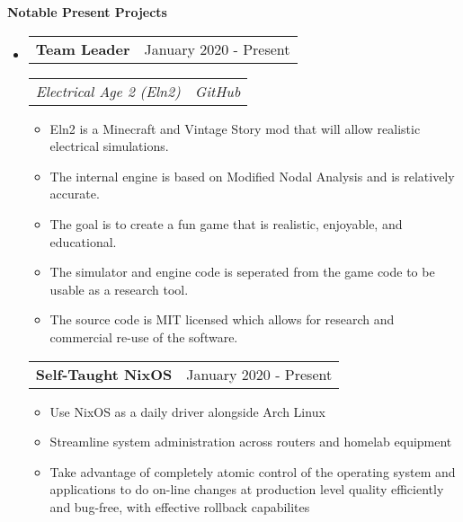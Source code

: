 \documentclass[letterpaper,12pt]{article}
\makeatletter
\newcommand{\resitem}[1]{\item #1 \vspace{-3pt}}
\newcommand{\resheading}[1]{{\large {\textbf{#1 \vphantom{p\^{E}}}}}\vspace{-3pt}}
\newcommand{\topheading}[2]{
\begin{tabular*}{6.5in}{l@{\extracolsep{\fill}}r}
		\textbf{#1} & #2 \\
\end{tabular*}}
\newcommand{\bottomheading}[2]{
\begin{tabular*}{6.5in}{l@{\extracolsep{\fill}}r}
		\textit{#1} & \textit{#2} \\
\end{tabular*}\vspace{-6pt}}
\newcommand{\singleheading}[2]{
\vspace{6pt}
\begin{tabular*}{6.5in}{l@{\extracolsep{\fill}}r}
		\textbf{#1} & #2 \\
\end{tabular*}
\vspace{-3pt}
}
\makeatother
\begin{document}
\resheading{Notable Present Projects}
\begin{itemize}
	\item[]

	\topheading{Team Leader}{January 2020 - Present}
	\bottomheading{Electrical Age 2 (Eln2)}{GitHub}
	\begin{itemize}
		\resitem{Eln2 is a Minecraft and Vintage Story mod that will allow realistic electrical simulations.}
		\resitem{The internal engine is based on Modified Nodal Analysis and is relatively accurate.}
		\resitem{The goal is to create a fun game that is realistic, enjoyable, and educational.}
		\resitem{The simulator and engine code is seperated from the game code to be usable as a research tool.}
		\resitem{The source code is MIT licensed which allows for research and commercial re-use of the software.}
	\end{itemize}

	\singleheading{Self-Taught NixOS}{January 2020 - Present}
	\begin{itemize}
		\resitem{Use NixOS as a daily driver alongside Arch Linux}
		\resitem{Streamline system administration across routers and homelab equipment}
		\resitem{Take advantage of completely atomic control of the operating system and applications to do on-line changes at production level quality efficiently and bug-free, with effective rollback capabilites}
	\end{itemize}

\end{itemize}


\newpage
\end{document}
